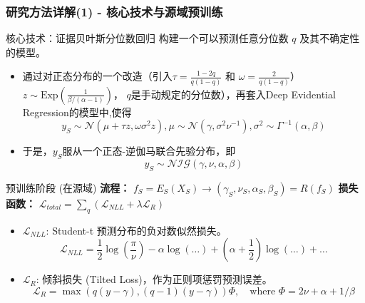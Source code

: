 \documentclass{beamer}
\newcommand{\Lcal}{\mathcal{L}}
\begin{document}
\begin{frame}[allowframebreaks]
    \frametitle{研究方法详解(1) - 核心技术与源域预训练}
    \begin{block}{核心技术：证据贝叶斯分位数回归}
        构建一个可以预测任意分位数 $q$ 及其不确定性的模型。
        \begin{itemize}
            \item 通过对正态分布的一个改造（引入$\tau = \frac{1 - 2q}{q(1 - q)}$ 和 $\omega = \frac{2}{q(1 - q)}$）$z \sim \mathrm{Exp}\left(\frac{1}{\beta / (\alpha - 1)}\right)$， $q$是手动规定的分位数），再套入Deep Evidential Regression的模型中,使得
            $$y_{S}\sim \mathcal{N}(\mu +\tau z,\omega \sigma^{2}z),\mu \sim \mathcal{N}(\gamma ,\sigma^{2}\nu^{-1}),\sigma^{2}\sim \Gamma^{-1}(\alpha ,\beta)$$
            \item 于是，$y_S$服从一个正态-逆伽马联合先验分布，即$$y_{S}\sim \mathcal{NIG}(\gamma, \nu, \alpha, \beta)$$
        \end{itemize}
    \end{block}
    
    \begin{block}{预训练阶段 (在源域)}
        \textbf{流程：} $f_S = E_S(X_S) \rightarrow (\gamma_S, \nu_S, \alpha_S, \beta_S) = R(f_S)$
        \vfill
        \textbf{损失函数：} $\Lcal_{total} = \sum_{q}(\Lcal_{NLL} + \lambda \Lcal_R)$
        \begin{itemize}
            \item $\Lcal_{NLL}$: Student-t 预测分布的负对数似然损失。
            $$ \Lcal_{NLL} = \frac{1}{2}\log(\frac{\pi}{\nu}) - \alpha\log(\dots) + (\alpha+\frac{1}{2})\log(\dots) + \dots $$
            \item $\Lcal_R$: 倾斜损失 (Tilted Loss)，作为正则项惩罚预测误差。
            $$ \Lcal_R = \max(q(y - \gamma), (q - 1)(y - \gamma))\Phi, \quad \text{where } \Phi = 2\nu + \alpha + 1 / \beta $$
        \end{itemize}
    \end{block}
\end{frame}
\end{document}
